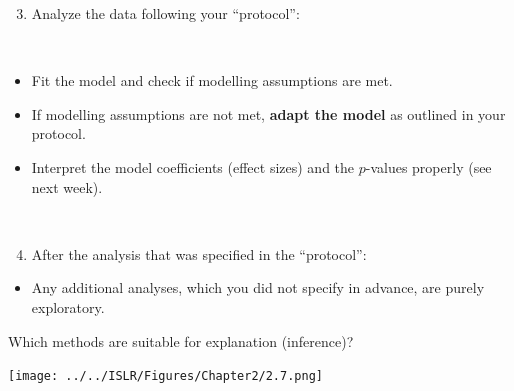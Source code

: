 \documentclass[10pt,ignorenonframetext,]{beamer}
\providecommand{\tightlist}{%
  \setlength{\itemsep}{0pt}\setlength{\parskip}{0pt}}
\begin{document}
\begin{frame}

\begin{enumerate}
\setcounter{enumi}{2}
\tightlist
\item
  Analyze the data following your ``protocol'':
\end{enumerate}

\(~\)

\begin{itemize}
\item
  Fit the model and check if modelling assumptions are met.
\item
  If modelling assumptions are not met, \textbf{adapt the model} as
  outlined in your protocol.
\item
  Interpret the model coefficients (effect sizes) and the \(p\)-values
  properly (see next week).
\end{itemize}

\(~\)

\begin{enumerate}
\setcounter{enumi}{3}
\tightlist
\item
  After the analysis that was specified in the ``protocol'':
\end{enumerate}

\begin{itemize}
\tightlist
\item
  Any additional analyses, which you did not specify in advance, are
  purely exploratory.
\end{itemize}

\end{frame}

\begin{frame}

Which methods are suitable for explanation (inference)? \vspace{-2mm}

\centering

\texttt{[image: ../../ISLR/Figures/Chapter2/2.7.png]}

\end{frame}
\end{document}

